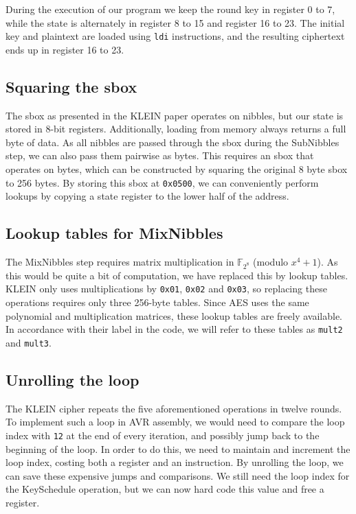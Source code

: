 \documentclass[a4paper]{article}
\begin{document}
During the execution of our program we keep the round key in register 0 to 7, while the state is alternately in register 8 to 15 and register 16 to 23. The initial key and plaintext are loaded using \texttt{ldi} instructions, and the resulting ciphertext ends up in register 16 to 23.


\subsection*{Squaring the sbox}

The sbox as presented in the KLEIN paper operates on nibbles, but our state is stored in 8-bit registers. Additionally, loading from memory always returns a full byte of data. As all nibbles are passed through the sbox during the SubNibbles step, we can also pass them pairwise as bytes. This requires an sbox that operates on bytes, which can be constructed by squaring the original 8 byte sbox to 256 bytes. By storing this sbox at \texttt{0x0500}, we can conveniently perform lookups by copying a state register to the lower half of the address.

\subsection*{Lookup tables for MixNibbles}

The MixNibbles step requires matrix multiplication in $\mathbb{F}_{2^8}$ (modulo $x^4 + 1$). As this would be quite a bit of computation, we have replaced this by lookup tables. KLEIN only uses multiplications by \texttt{0x01}, \texttt{0x02} and \texttt{0x03}, so replacing these operations requires only three 256-byte tables. Since AES uses the same polynomial and multiplication matrices, these lookup tables are freely available. In accordance with their label in the code, we will refer to these tables as \texttt{mult2} and \texttt{mult3}.

\subsection*{Unrolling the loop}

The KLEIN cipher repeats the five aforementioned operations in twelve rounds. To implement such a loop in AVR assembly, we would need to compare the loop index with \texttt{12} at the end of every iteration, and possibly jump back to the beginning of the loop. In order to do this, we need to maintain and increment the loop index, costing both a register and an instruction. By unrolling the loop, we can save these expensive jumps and comparisons. We still need the loop index for the KeySchedule operation, but we can now hard code this value and free a register.
\end{document}
